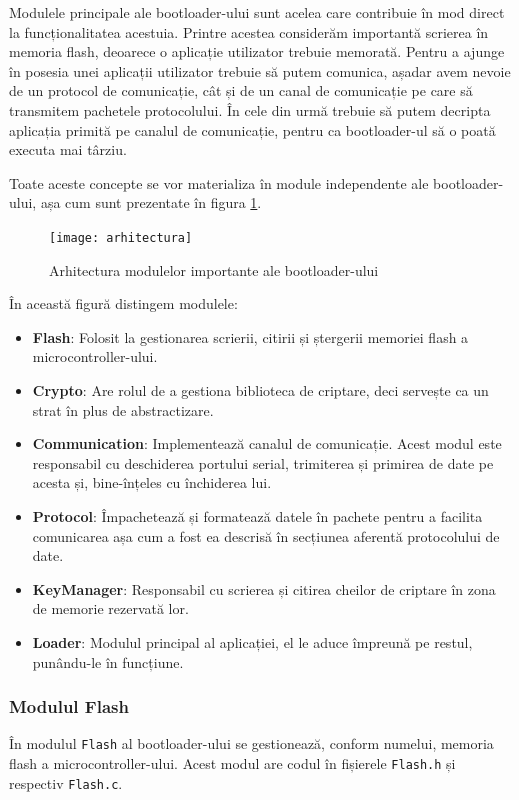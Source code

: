 \documentclass[12pt,a4paper,titlepage]{report}
\begin{document}
Modulele principale ale bootloader-ului sunt acelea care contribuie în mod direct la funcționalitatea acestuia. Printre acestea considerăm importantă scrierea în memoria flash, deoarece o aplicație utilizator trebuie memorată.
Pentru a ajunge în posesia unei aplicații utilizator trebuie să putem comunica, așadar avem nevoie de un protocol de comunicație, cât și de un canal de comunicație pe care să transmitem pachetele protocolului. În cele din urmă trebuie să putem decripta aplicația primită pe canalul de comunicație, pentru ca bootloader-ul să o poată executa mai târziu.

Toate aceste concepte se vor materializa în module independente ale bootloader-ului, așa cum sunt prezentate în figura \ref{arhitectura}.

\begin{figure}[h]
    \centering
    \texttt{[image: arhitectura]}
    \caption{Arhitectura modulelor importante ale bootloader-ului}
    \label{arhitectura}
\end{figure}

În această figură distingem modulele:
\begin{itemize}
\item \textbf{Flash}: Folosit la gestionarea scrierii, citirii și ștergerii memoriei flash a microcontroller-ului.
\item \textbf{Crypto}: Are rolul de a gestiona biblioteca de criptare, deci servește ca un strat în plus de abstractizare.
\item \textbf{Communication}: Implementează canalul de comunicație. Acest modul este responsabil cu deschiderea portului serial, trimiterea și primirea de date pe acesta și, bine-înțeles cu închiderea lui.
\item \textbf{Protocol}: Împachetează și formatează datele în pachete pentru a facilita comunicarea așa cum a fost ea descrisă în secțiunea aferentă protocolului de date.
\item \textbf{KeyManager}: Responsabil cu scrierea și citirea cheilor de criptare în zona de memorie rezervată lor.
\item \textbf{Loader}: Modulul principal al aplicației, el le aduce împreună pe restul, punându-le în funcțiune.
\end{itemize}

\subsubsection{Modulul Flash}
În modulul \texttt{Flash} al bootloader-ului se gestionează, conform numelui, memoria flash a microcontroller-ului. Acest modul are codul în fișierele \texttt{Flash.h} și respectiv \texttt{Flash.c}.
\end{document}

